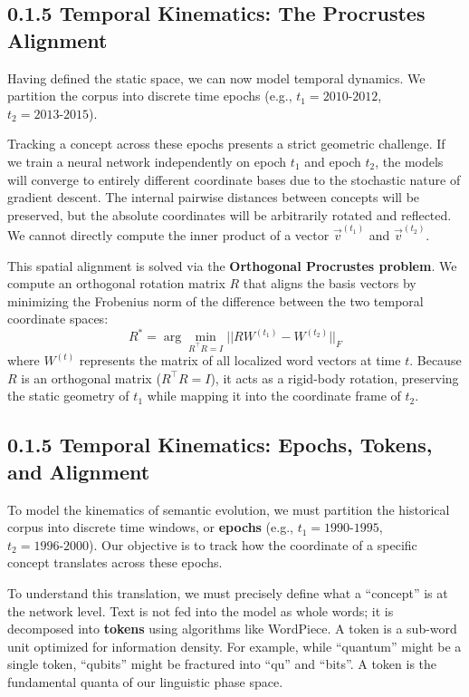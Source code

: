 \subsection*{0.1.5 Temporal Kinematics: The Procrustes Alignment}

Having defined the static space, we can now model temporal dynamics. We partition the corpus into discrete time epochs (e.g., $t_1 = 2010\text{-}2012$, $t_2 = 2013\text{-}2015$).

Tracking a concept across these epochs presents a strict geometric challenge. If we train a neural network independently on epoch $t_1$ and epoch $t_2$, the models will converge to entirely different coordinate bases due to the stochastic nature of gradient descent. The internal pairwise distances between concepts will be preserved, but the absolute coordinates will be arbitrarily rotated and reflected. We cannot directly compute the inner product of a vector $\vec{v}^{(t_1)}$ and $\vec{v}^{(t_2)}$.

This spatial alignment is solved via the \textbf{Orthogonal Procrustes problem}. We compute an orthogonal rotation matrix $R$ that aligns the basis vectors by minimizing the Frobenius norm of the difference between the two temporal coordinate spaces:
\begin{equation}
    R^* = \arg\min_{R^\top R = I} ||RW^{(t_1)} - W^{(t_2)}||_F
\end{equation}
where $W^{(t)}$ represents the matrix of all localized word vectors at time $t$. Because $R$ is an orthogonal matrix ($R^\top R = I$), it acts as a rigid-body rotation, preserving the static geometry of $t_1$ while mapping it into the coordinate frame of $t_2$.



\subsection*{0.1.5 Temporal Kinematics: Epochs, Tokens, and Alignment}

To model the kinematics of semantic evolution, we must partition the historical corpus into discrete time windows, or \textbf{epochs} (e.g., $t_1 = 1990\text{-}1995$, $t_2 = 1996\text{-}2000$). Our objective is to track how the coordinate of a specific concept translates across these epochs.

To understand this translation, we must precisely define what a ``concept'' is at the network level. Text is not fed into the model as whole words; it is decomposed into \textbf{tokens} using algorithms like WordPiece. A token is a sub-word unit optimized for information density. For example, while ``quantum'' might be a single token, ``qubits'' might be fractured into ``qu'' and ``bits''. A token is the fundamental quanta of our linguistic phase space.

